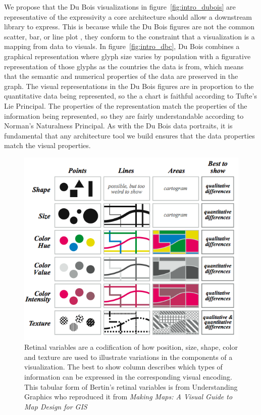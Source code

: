 \documentclass[../main.tex]{subfiles}
\begin{document}
We propose that the Du Bois visualizations in figure~\ref{fig:intro_dubois} are representative of the expressivity a core architecture should allow a downstream library to express. This is because while the Du Bois figures are not the common scatter, bar, or line plot \cite{friendlyBriefHistoryData2008}, they conform to the constraint that a visualization is a mapping from data to visuals. In figure~\ref{fig:intro_dbc}, Du Bois combines a graphical representation where glyph size varies by population with a figurative representation of those glyphs as the countries the data is from, which means that the semantic and numerical properties of the data are preserved in the graph. The visual representations in the Du Bois figures are in proportion to the quantitative data being represented, so the a chart is faithful according to Tufte's Lie Principal\cite{tufteVisualDisplayQuantitative2001}. The properties of the representation match the properties of the information being represented, so they are fairly understandable according to Norman's Naturalness Principal\cite{norman_things_smart}. As with the Du Bois data portraits, it is fundamental that any architecture tool we build ensures that the data properties match the visual properties. 


\begin{figure}[H]
\includegraphics[width=1\textwidth]{figures/intro/retinal_variables.png}
\caption{Retinal variables are a codification of how position, size, shape, color and texture are used to illustrate variations in the components of a visualization. The best to show column describes which types of information can be expressed in the corresponding visual encoding. This tabular form of Bertin's retinal variables is from Understanding Graphics \cite{malamedInformationDisplayTips2010} who reproduced it from \textit{Making Maps: A Visual Guide to Map Design for GIS} 
\cite{krygierMakingMapsVisual2005}}
\label{fig:intro_retinal_variables}
\end{figure}
\end{document}
